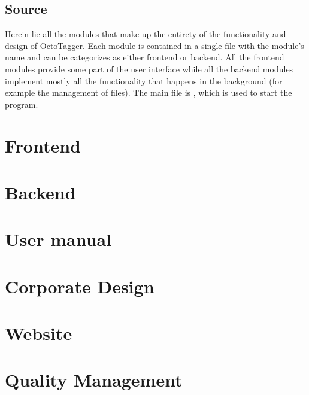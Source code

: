 \subsection{Source}
Herein lie all the modules that make up the entirety of the functionality and
design of OctoTagger. Each module is contained in a single file with the
module's name and can be categorizes as either frontend or backend. All the
frontend modules provide some part of the user interface while all the backend
modules implement mostly all the functionality that happens in the background
(for example the management of files). The main file is ,
which is used to start the program.



\section{Frontend}











\section{Backend}











\section{User manual}

\section{Corporate Design}
%
\section{Website}
%

\section{Quality Management}
